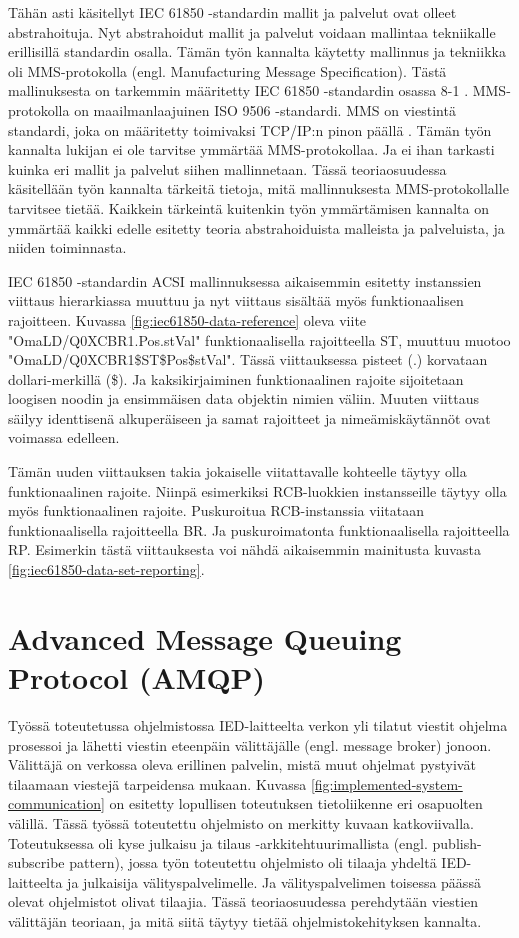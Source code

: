 Tähän asti käsitellyt IEC 61850 -standardin mallit ja palvelut ovat olleet abstrahoituja. Nyt abstrahoidut mallit ja palvelut voidaan mallintaa tekniikalle erillisillä standardin osalla. Tämän työn kannalta käytetty mallinnus ja tekniikka oli MMS-protokolla (engl. Manufacturing Message Specification). Tästä mallinuksesta on tarkemmin määritetty IEC 61850 -standardin osassa 8-1 \cite{IEC61850-8-1}. MMS-protokolla on maailmanlaajuinen ISO 9506 -standardi. MMS on viestintä standardi, joka on määritetty toimivaksi TCP/IP:n pinon päällä \cite{MMS-protocol-stack-and-API}. Tämän työn kannalta lukijan ei ole tarvitse ymmärtää MMS-protokollaa. Ja ei ihan tarkasti kuinka eri mallit ja palvelut siihen mallinnetaan. Tässä teoriaosuudessa käsitellään työn kannalta tärkeitä tietoja, mitä mallinnuksesta MMS-protokollalle tarvitsee tietää. Kaikkein tärkeintä kuitenkin työn ymmärtämisen kannalta on ymmärtää kaikki edelle esitetty teoria abstrahoiduista malleista ja palveluista, ja niiden toiminnasta. \cite{Introduction-to-the-MMS}

IEC 61850 -standardin ACSI mallinnuksessa aikaisemmin esitetty instanssien viittaus hierarkiassa muuttuu ja nyt viittaus sisältää myös funktionaalisen rajoitteen. Kuvassa \ref{fig:iec61850-data-reference} oleva viite "OmaLD/Q0XCBR1.Pos.stVal" funktionaalisella rajoitteella ST, muuttuu muotoo "OmaLD/Q0XCBR1\$ST\$Pos\$stVal". Tässä viittauksessa pisteet (.) korvataan dollari-merkillä (\$). Ja kaksikirjaiminen funktionaalinen rajoite sijoitetaan loogisen noodin ja ensimmäisen data objektin nimien väliin. Muuten viittaus säilyy identtisenä alkuperäiseen ja samat rajoitteet ja nimeämiskäytännöt ovat voimassa edelleen. \cite[s.~34--35, 111]{IEC61850-8-1}

Tämän uuden viittauksen takia jokaiselle viitattavalle kohteelle täytyy olla funktionaalinen rajoite. Niinpä esimerkiksi RCB-luokkien instansseille täytyy olla myös funktionaalinen rajoite. Puskuroitua RCB-instanssia viitataan funktionaalisella rajoitteella BR. Ja puskuroimatonta funktionaalisella rajoitteella RP. Esimerkin tästä viittauksesta voi nähdä aikaisemmin mainitusta kuvasta \ref{fig:iec61850-data-set-reporting}. \cite[s.~32--34, 75]{IEC61850-8-1}


\section{Advanced Message Queuing Protocol (AMQP)}
Työssä toteutetussa ohjelmistossa IED-laitteelta verkon yli tilatut viestit ohjelma prosessoi ja lähetti viestin eteenpäin välittäjälle (engl. message broker) jonoon. Välittäjä on verkossa oleva erillinen palvelin, mistä muut ohjelmat pystyivät tilaamaan viestejä tarpeidensa mukaan. Kuvassa \ref{fig:implemented-system-communication} on esitetty lopullisen toteutuksen tietoliikenne eri osapuolten välillä. Tässä työssä toteutettu ohjelmisto on merkitty kuvaan katkoviivalla. Toteutuksessa oli kyse julkaisu ja tilaus -arkkitehtuurimallista (engl. publish-subscribe pattern), jossa työn toteutettu ohjelmisto oli tilaaja yhdeltä IED-laitteelta ja julkaisija välityspalvelimelle. Ja välityspalvelimen toisessa päässä olevat ohjelmistot olivat tilaajia. Tässä teoriaosuudessa perehdytään viestien välittäjän teoriaan, ja mitä siitä täytyy tietää ohjelmistokehityksen kannalta.

